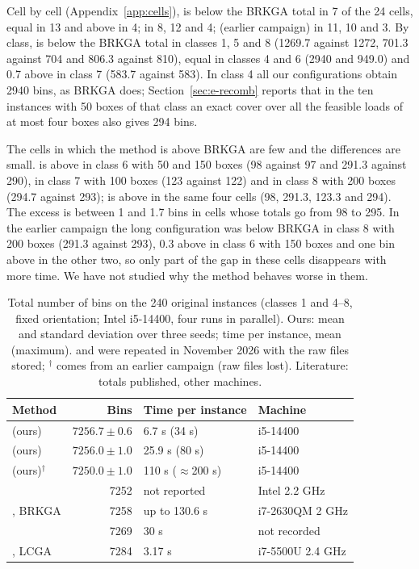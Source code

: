 Cell by cell (Appendix~\ref{app:cells}), \cfgfast{} is below the BRKGA total in 7 of the 24 cells, equal in 13 and above in 4;
\cfgbal{} in 8, 12 and 4; \cfgqual{} (earlier campaign) in 11, 10 and 3. By class, \cfgqual{} is below the BRKGA total in classes 1, 5 and 8 (1269.7
against 1272, 701.3 against 704 and 806.3 against 810), equal in classes 4 and 6 (2940 and 949.0) and 0.7 above in class 7 (583.7 against 583).
In class 4 all our configurations obtain 2940 bins, as BRKGA does; Section~\ref{sec:e-recomb} reports that in the ten instances with 50 boxes of that class an exact cover
over all the feasible loads of at most four boxes also gives 294 bins.

The cells in which the method is above BRKGA are few and the differences are small. \cfgfast{} is above in class 6 with 50 and 150 boxes (98 against 97 and 291.3 against 290), in class 7 with 100 boxes (123 against 122)
and in class 8 with 200 boxes (294.7 against 293); \cfgbal{} is above in the same four cells (98, 291.3, 123.3 and 294). The excess is between 1 and 1.7 bins in cells whose totals go from 98 to 295. In the earlier campaign the long
configuration was below BRKGA in class 8 with 200 boxes (291.3 against 293), 0.3 above in class 6 with 150 boxes and one bin above in the other two, so only part of the gap in these cells disappears with more time.
We have not studied why the method behaves worse in them.

\begin{table}[t]
\centering
\small\setlength{\tabcolsep}{4pt}
\caption{Total number of bins on the 240 original instances (classes 1 and 4--8, fixed orientation; Intel i5-14400, four runs in parallel). Ours: mean and
standard deviation over three seeds; time per instance, mean (maximum). \cfgfast{} and \cfgbal{} were repeated in November 2026 with the raw files stored;
$^\dagger$ \cfgqual{} comes from an earlier campaign (raw files lost). Literature: totals published, other machines.}
\label{tab:e-main}
\begin{tabular}{@{}lrll@{}}
\toprule
Method & Bins & Time per instance & Machine\\
\midrule
\cfgfast{} (ours) & $7256.7\pm 0.6$ & 6.7 s (34 s) & i5-14400\\
\cfgbal{} (ours) & $7256.0\pm 1.0$ & 25.9 s (80 s) & i5-14400\\
\cfgqual{} (ours)$^\dagger$ & $7250.0\pm 1.0$ & 110 s ($\approx$200 s) & i5-14400\\
\midrule
\citet{Mahvash2018} & 7252 & not reported & Intel 2.2 GHz\\
\citet{Goncalves2013}, BRKGA & 7258 & up to 130.6 s & i7-2630QM 2 GHz\\
\citet{Zhu2012SD} & 7269 & 30 s & not recorded\\
\citet{Elhedhli2019}, LCGA & 7284 & 3.17 s & i7-5500U 2.4 GHz\\
\bottomrule
\end{tabular}
\end{table}

